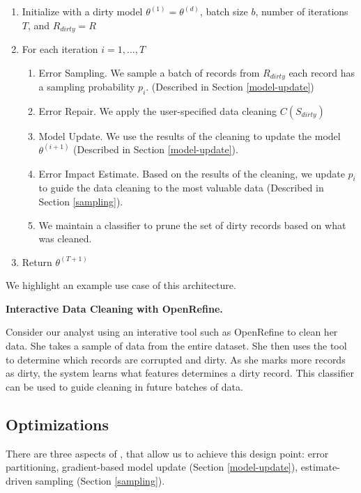 \begin{enumerate}
\item Initialize with a dirty model $\theta^{(1)} = \theta^{(d)}$, batch size $b$, number of iterations $T$, and $R_{dirty} = R$
\item For each iteration $i=1,...,T$
\begin{enumerate}
\item Error Sampling. We sample a batch of records from $R_{dirty}$ each record has a sampling probability $p_i$. (Described in Section \ref{model-update})
\item Error Repair. We apply the user-specified data cleaning $C(S_{dirty})$
\item Model Update. We use the results of the cleaning to update the model $\theta^{(i+1)}$ (Described in Section \ref{model-update}).
\item Error Impact Estimate. Based on the results of the cleaning, we update $p_i$ to guide the data cleaning to the most valuable data (Described in Section \ref{sampling}).
\item We maintain a classifier to prune the set of dirty records based on what was cleaned.
\end{enumerate}
\item Return $\theta^{(T+1)}$
\end{enumerate}

\noindent We highlight an example use case of this architecture.

\vspace{0.5em}

\noindent\textbf{Interactive Data Cleaning with OpenRefine.}
\begin{example}
Consider our analyst using an interative tool such as OpenRefine \cite{openrefine} to clean her data. 
She takes a sample of data from the entire dataset.
She then uses the tool to determine which records are corrupted and dirty.
As she marks more records as dirty, the system learns what features determines a dirty record.
This classifier can be used to guide cleaning in future batches of data.
\end{example}

\iffalse
\subsection{Optimizations}
There are three aspects of \sys, that allow us to achieve this design point: error partitioning, gradient-based model update (Section \ref{model-update}), estimate-driven sampling (Section \ref{sampling}).

